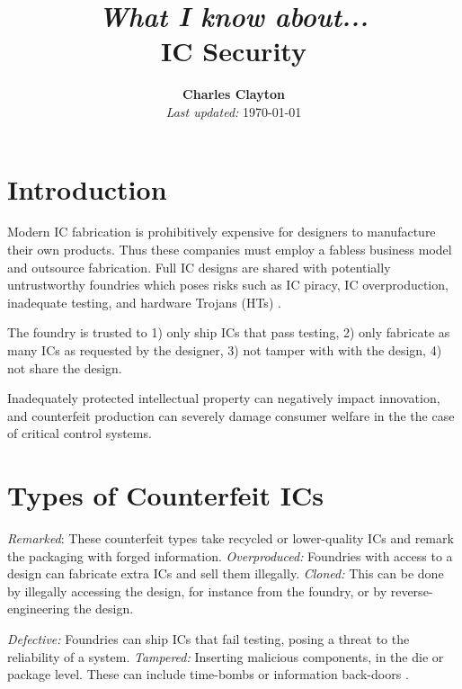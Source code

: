 \documentclass{IEEEtran}
\title{\small \textit{What I know about...} \\ \Huge IC Security}
\author{\textbf{Charles Clayton} \\ \small \textit{Last updated:} \today}
\begin{document}
\maketitle

\section{Introduction}

Modern IC fabrication is prohibitively expensive for designers to manufacture their own products. Thus these companies must employ a fabless business model and outsource fabrication. Full IC designs are shared with potentially untrustworthy foundries \cite{SST} which poses risks such as IC piracy, IC overproduction, inadequate testing, and hardware Trojans (HTs)   \cite{tehranipoor2015counterfeit}.
 
The foundry is trusted to 1) only ship ICs that pass testing, 2) only fabricate as many ICs as requested by the designer, 3) not tamper with with the design, 4) not share the design. 

Inadequately protected intellectual property can negatively impact innovation, and counterfeit production can severely damage consumer welfare in the the case of critical control systems.







\section{Types of Counterfeit ICs}



\textit{Remarked}: These counterfeit types take recycled or lower-quality ICs and remark the packaging with forged information. \textit{Overproduced:} Foundries with access to a design can fabricate extra ICs and sell them illegally. \textit{Cloned:} This can be done by illegally accessing the design, for instance from the foundry, or by reverse-engineering the design. 

\textit{Defective:} Foundries can ship ICs that fail testing, posing a threat to the reliability of a system. \textit{Tampered:} Inserting malicious components, in the die or package level. These can include time-bombs or information back-doors \cite{guin2014counterfeit}. 
\end{document}
